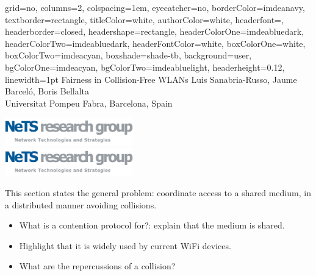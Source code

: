 \documentclass[portrait,a0paper]{baposter}
\begin{document}
\begin{poster}
{
	grid=no,
	columns=2,
	colspacing=1em,
	eyecatcher=no,
	borderColor=imdeanavy,
	textborder=rectangle,
    titleColor=white,
    authorColor=white,
	headerfont=\textsf,
	headerborder=closed,
	headershape=rectangle,
	headerColorOne=imdeabluedark,
	headerColorTwo=imdeabluedark,
	headerFontColor=white,
	boxColorOne=white,
	boxColorTwo=imdeacyan,
	boxshade=shade-tb,
	background=user,
	bgColorOne=imdeacyan,
	bgColorTwo=imdeabluelight,
	headerheight=0.12\textheight,
	linewidth=1pt
}
{
}
{Fairness in Collision-Free WLANs}
{
	Luis Sanabria-Russo, Jaume Barcel{\'o}, Boris Bellalta\vspace{0.5em}\\
	\normalsize Universitat Pompeu Fabra, Barcelona, Spain
}
{
\begin{minipage}{17em}
	\begin{center}
		\ifpdf
			\includegraphics[width=15em]{NeTS-logo-eps-converted-to.pdf}\\
		\else
			\includegraphics[width=15em]{NeTS-logo.eps}\\
		\fi
	\end{center}
\end{minipage}
}

{
This section states the general problem: coordinate access to a shared medium, in a distributed manner avoiding collisions.
\begin{itemize}
 \item What is a contention protocol for?: explain that the medium is shared.
 \item Highlight that it is widely used by current WiFi devices.
 \item What are the repercussions of a collision?
\end{itemize}

}

\end{poster}
\end{document}
